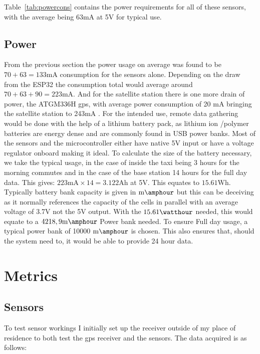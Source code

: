 \noindent Table~\ref{tab:powercons} \cite{sen55} contains the power requirements for all of these sensors, with the average being 63mA at 5V for typical use.

\subsection{Power}
From the previous section the power usage on average was found to be $ 70 +  63 = 133\si{\milli\ampere}$ consumption for the sensors alone. Depending on the draw from the ESP32 the consumption total would average around $ 70 +  63 + 90 = 223\si{\milli\ampere}$\cite{wifiespnow}.
And for the satellite station there is one more drain of power, the ATGM336H gps, with average power consumption of 20 mA\cite{atgm336h} bringing the satellite station to 243mA .
%
\noindent
For the intended use, remote data gathering would be done with the help of a lithium battery pack, as lithium ion /polymer batteries are energy dense and are commonly found in USB power banks. Most of the sensors and the microcontroller either have native 5V input or have a voltage regulator onboard making it ideal. To calculate the size of the battery necessary, we take the typical usage, in the case of inside the taxi being 3 hours for the morning commutes and in the case of the base station 14 hours for the full day data. This gives: $223\si{\milli\ampere} \times 14 = 3.122 \si{\ampere\hour} $ at 5V. This equates to $15.61 \si{\watt\hour}$. Typically battery bank capacity is given in $ \si{\milli\amphour} $ but this can be deceiving as it normally references the capacity of the cells in parallel with an average voltage of 3.7V not the 5V output. With the $15.61 \si{\watthour}$ needed, this would equate to a  $ 4218,9\si{\milli\amphour} $ Power bank needed. To ensure Full day usage, a typical power bank of 10000 $ \si{\milli\amphour} $ is chosen. This also ensures that, should the system need to, it would be able to provide 24 hour data.
\pagebreak

\section{Metrics}

\subsection{Sensors}
To test sensor workings I initially set up the receiver outside of my place of residence to both test the gps receiver and the sensors. The data acquired is as follows:




